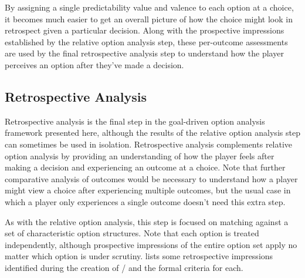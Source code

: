 By assigning a single predictability value and valence to each option at a choice, it becomes much easier to get an overall picture of how the choice might look in retrospect given a particular decision.
%
Along with the prospective impressions established by the relative option analysis step, these per-outcome assessments are used by the final retrospective analysis step to understand how the player perceives an option after they've made a decision.


\subsection{Retrospective Analysis}

\label{sec:cp-retrospective-analysis}


Retrospective analysis is the final step in the goal-driven option analysis framework presented here, although the results of the relative option analysis step can sometimes be used in isolation.
%
Retrospective analysis complements relative option analysis by providing an understanding of how the player feels after making a decision and experiencing an outcome at a choice.
%
Note that further comparative analysis of outcomes would be necessary to understand how a player might view a choice after experiencing multiple outcomes, but the usual case in which a player only experiences a single outcome doesn't need this extra step.


As with the relative option analysis, this step is focused on matching against a set of characteristic option structures.
%
Note that each option is treated independently, although prospective impressions of the entire option set apply no matter which option is under scrutiny.
%
 lists some retrospective impressions identified during the creation of \dunyazad/ and the formal criteria for each.


